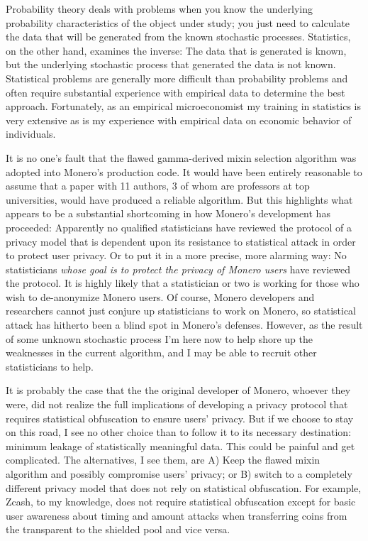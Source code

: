 \documentclass[english]{paper}
\begin{document}
Probability theory deals with problems when you know the underlying
probability characteristics of the object under study; you just need
to calculate the data that will be generated from the known stochastic
processes. Statistics, on the other hand, examines the inverse: The
data that is generated is known, but the underlying stochastic process
that generated the data is not known. Statistical problems are generally
more difficult than probability problems and often require substantial
experience with empirical data to determine the best approach. Fortunately,
as an empirical microeconomist my training in statistics is very extensive
as is my experience with empirical data on economic behavior of individuals.

It is no one's fault that the flawed gamma-derived mixin selection
algorithm was adopted into Monero's production code. It would have
been entirely reasonable to assume that a paper with 11 authors, 3
of whom are professors at top universities, would have produced a
reliable algorithm. But this highlights what appears to be a substantial
shortcoming in how Monero's development has proceeded: Apparently
no qualified statisticians have reviewed the protocol of a privacy
model that is dependent upon its resistance to statistical attack
in order to protect user privacy. Or to put it in a more precise,
more alarming way: No statisticians \textit{whose goal is to protect
the privacy of Monero users} have reviewed the protocol. It is highly
likely that a statistician or two is working for those who wish to
de-anonymize Monero users. Of course, Monero developers and researchers
cannot just conjure up statisticians to work on Monero, so statistical
attack has hitherto been a blind spot in Monero's defenses. However,
as the result of some unknown stochastic process I'm here now to help
shore up the weaknesses in the current algorithm, and I may be able
to recruit other statisticians to help.

It is probably the case that the the original developer of Monero,
whoever they were, did not realize the full implications of developing
a privacy protocol that requires statistical obfuscation to ensure
users' privacy. But if we choose to stay on this road, I see no other
choice than to follow it to its necessary destination: minimum leakage
of statistically meaningful data. This could be painful and get complicated.
The alternatives, I see them, are A) Keep the flawed mixin algorithm
and possibly compromise users' privacy; or B) switch to a completely
different privacy model that does not rely on statistical obfuscation.
For example, Zcash, to my knowledge, does not require statistical
obfuscation except for basic user awareness about timing and amount
attacks when transferring coins from the transparent to the shielded
pool and vice versa.
\end{document}
